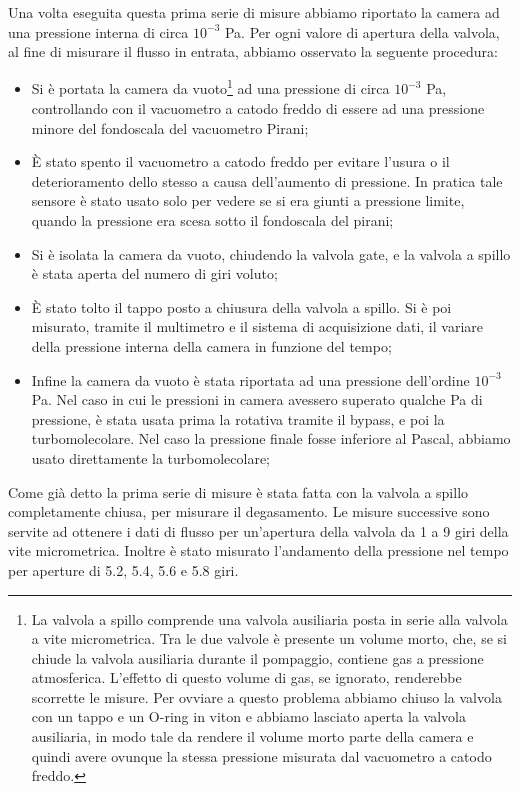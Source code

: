 Una volta eseguita questa prima serie di misure abbiamo riportato la camera ad una pressione interna di circa $10^{-3}$ \si{\pascal}. Per ogni valore di apertura della valvola, al fine di misurare il flusso in entrata, abbiamo osservato la seguente procedura:
\begin{itemize}
	\item{Si è portata la camera da vuoto\footnote{La valvola a spillo comprende una valvola ausiliaria posta in serie
	alla valvola a vite micrometrica. Tra le due valvole è presente un volume morto, che, se si chiude la valvola ausiliaria
	durante il pompaggio, contiene gas a pressione atmosferica. L'effetto di questo volume di gas, se ignorato, renderebbe
	scorrette le misure. Per ovviare a questo problema abbiamo chiuso la valvola con un tappo e un O-ring in viton e abbiamo
	lasciato aperta la valvola ausiliaria, in modo tale da rendere il volume morto parte della camera e quindi avere ovunque
	la stessa pressione misurata dal vacuometro a catodo freddo.} ad una pressione di circa $10^{-3}$ \si{\pascal},
	controllando con il vacuometro a catodo freddo di essere ad una pressione minore del fondoscala del vacuometro Pirani;}
	\item{È stato spento il vacuometro a catodo freddo per evitare l'usura o il deterioramento dello stesso a causa dell'aumento di pressione.
	In pratica tale sensore è stato usato solo per vedere se si era giunti a pressione limite, quando la pressione era scesa sotto
	il fondoscala del pirani;}
	\item{Si è isolata la camera da vuoto, chiudendo la valvola gate, e la valvola a spillo è stata aperta del numero di giri voluto;}
	\item{È stato tolto il tappo posto a chiusura della valvola a spillo. Si è poi misurato, tramite il multimetro e il sistema di acquisizione dati, il variare della pressione interna della camera in funzione del tempo;}
	\item{Infine la camera da vuoto è stata riportata ad una pressione dell'ordine $10^{-3}$ \si{\pascal}. Nel caso in cui le pressioni
	in camera avessero superato qualche \si{\Pa} di pressione, è stata usata prima la rotativa tramite il bypass, e poi la turbomolecolare.
	Nel caso la pressione finale fosse inferiore al Pascal, abbiamo usato direttamente la turbomolecolare;}
\end{itemize}

Come già detto la prima serie di misure è stata fatta con la valvola a spillo completamente chiusa, per misurare il degasamento.
Le misure successive sono servite ad ottenere i dati di flusso per un'apertura della valvola da 1 a 9 giri della vite micrometrica.
Inoltre è stato misurato l'andamento della pressione nel tempo per aperture di 5.2, 5.4, 5.6 e 5.8 giri.

